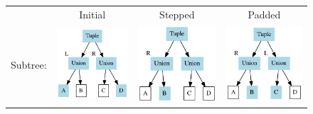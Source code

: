 \documentclass[a4paper,english]{lipics-v2019}
\begin{document}
\begin{figure}
\centering
\begin{tabularx}{\linewidth}{c|ccc}
& Initial & Stepped & Padded\\
Subtree: &
\includegraphics[scale=0.55]{figures-gen/transex1.pdf} & 
\includegraphics[scale=0.55]{figures-gen/transex2.pdf} & 
\includegraphics[scale=0.55]{figures-gen/transex3.pdf} \\

\end{tabularx}
\end{figure}
\end{document}
